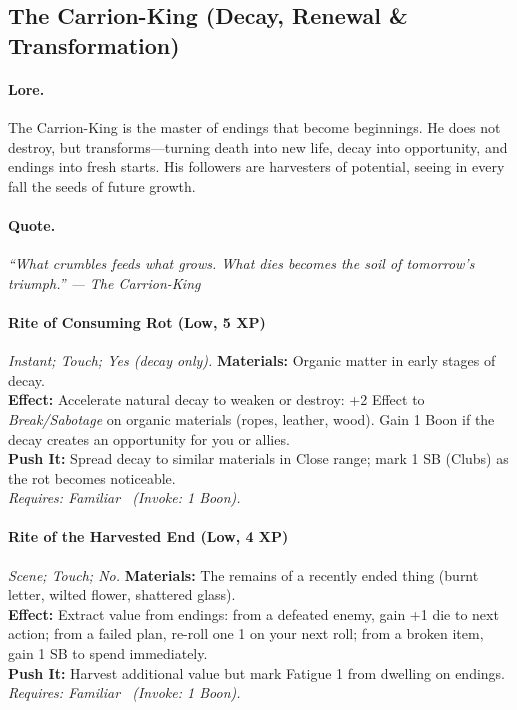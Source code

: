 \subsection{The Carrion-King (Decay, Renewal \& Transformation)}

\paragraph{Lore.}
The Carrion-King is the master of endings that become beginnings. He does not destroy, but transforms—turning death into new life, decay into opportunity, and endings into fresh starts. His followers are harvesters of potential, seeing in every fall the seeds of future growth.

\paragraph{Quote.}
\emph{``What crumbles feeds what grows. What dies becomes the soil of tomorrow's triumph.'' — The Carrion-King}

\paragraph{Rite of Consuming Rot (Low, 5 XP)} \emph{Instant; Touch; Yes (decay only).}
\textbf{Materials:} Organic matter in early stages of decay. \\
\textbf{Effect:} Accelerate natural decay to weaken or destroy: +2 Effect to \emph{Break/Sabotage} on organic materials (ropes, leather, wood). Gain 1 Boon if the decay creates an opportunity for you or allies. \\
\textbf{Push It:} Spread decay to similar materials in Close range; mark 1 SB (Clubs) as the rot becomes noticeable. \\
\emph{Requires: Familiar \ (\textit{Invoke:} 1 Boon).}

\paragraph{Rite of the Harvested End (Low, 4 XP)} \emph{Scene; Touch; No.}
\textbf{Materials:} The remains of a recently ended thing (burnt letter, wilted flower, shattered glass). \\
\textbf{Effect:} Extract value from endings: from a defeated enemy, gain +1 die to next action; from a failed plan, re-roll one 1 on your next roll; from a broken item, gain 1 SB to spend immediately. \\
\textbf{Push It:} Harvest additional value but mark Fatigue 1 from dwelling on endings. \\
\emph{Requires: Familiar \ (\textit{Invoke:} 1 Boon).}


